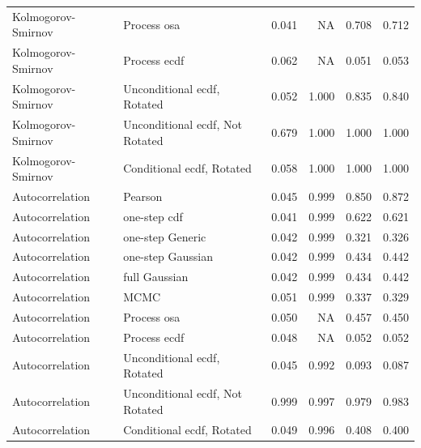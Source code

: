 \documentclass[
]{article}
\begin{document}
\begin{table}[H]
\begin{tabular}[t]{llrrrr}
Kolmogorov- Smirnov & Process osa & 0.041 & NA & 0.708 & 0.712\\
Kolmogorov- Smirnov & Process ecdf & 0.062 & NA & 0.051 & 0.053\\
Kolmogorov- Smirnov & Unconditional ecdf, Rotated & 0.052 & 1.000 & 0.835 & 0.840\\
\addlinespace
Kolmogorov- Smirnov & Unconditional ecdf, Not Rotated & 0.679 & 1.000 & 1.000 & 1.000\\
Kolmogorov- Smirnov & Conditional ecdf, Rotated & 0.058 & 1.000 & 1.000 & 1.000\\
Autocorrelation & Pearson & 0.045 & 0.999 & 0.850 & 0.872\\
Autocorrelation & one-step cdf & 0.041 & 0.999 & 0.622 & 0.621\\
Autocorrelation & one-step Generic & 0.042 & 0.999 & 0.321 & 0.326\\
\addlinespace
Autocorrelation & one-step Gaussian & 0.042 & 0.999 & 0.434 & 0.442\\
Autocorrelation & full Gaussian & 0.042 & 0.999 & 0.434 & 0.442\\
Autocorrelation & MCMC & 0.051 & 0.999 & 0.337 & 0.329\\
Autocorrelation & Process osa & 0.050 & NA & 0.457 & 0.450\\
Autocorrelation & Process ecdf & 0.048 & NA & 0.052 & 0.052\\
\addlinespace
Autocorrelation & Unconditional ecdf, Rotated & 0.045 & 0.992 & 0.093 & 0.087\\
Autocorrelation & Unconditional ecdf, Not Rotated & 0.999 & 0.997 & 0.979 & 0.983\\
Autocorrelation & Conditional ecdf, Rotated & 0.049 & 0.996 & 0.408 & 0.400\\
\bottomrule
\end{tabular}
\end{table}
\end{document}
